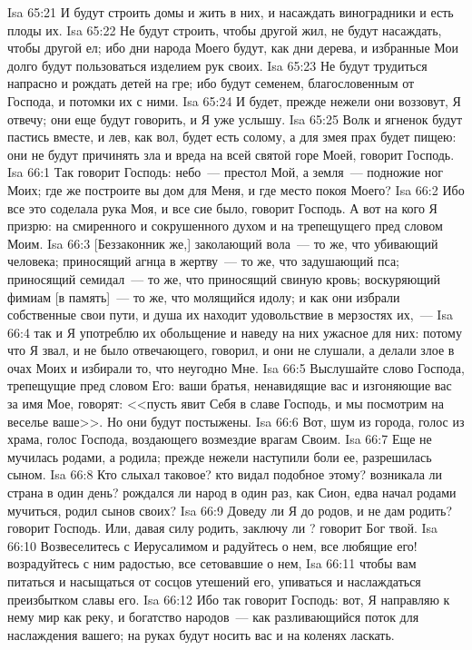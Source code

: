 \vs Isa 65:21 И будут строить домы и жить в них, и насаждать виноградники и есть плоды их.
\vs Isa 65:22 Не будут строить, чтобы другой жил, не будут насаждать, чтобы другой ел; ибо дни народа Моего будут, как дни дерева, и избранные Мои долго будут пользоваться изделием рук своих.
\vs Isa 65:23 Не будут трудиться напрасно и рождать детей на гре; ибо будут семенем, благословенным от Господа, и потомки их с ними.
\vs Isa 65:24 И будет, прежде нежели они воззовут, Я отвечу; они еще будут говорить, и Я уже услышу.
\vs Isa 65:25 Волк и ягненок будут пастись вместе, и лев, как вол, будет есть солому, а для змея прах будет пищею: они не будут причинять зла и вреда на всей святой горе Моей, говорит Господь.
\vs Isa 66:1 Так говорит Господь: небо~--- престол Мой, а земля~--- подножие ног Моих; где же построите вы дом для Меня, и где место покоя Моего?
\vs Isa 66:2 Ибо все это соделала рука Моя, и все сие было, говорит Господь. А вот на кого Я призрю: на смиренного и сокрушенного духом и на трепещущего пред словом Моим.
\vs Isa 66:3 [Беззаконник же,] заколающий вола~--- то же, что убивающий человека; приносящий агнца в жертву~--- то же, что задушающий пса; приносящий семидал~--- то же, что приносящий свиную кровь; воскуряющий фимиам [в память]~--- то же, что молящийся идолу; и как они избрали собственные свои пути, и душа их находит удовольствие в мерзостях их,~---
\vs Isa 66:4 так и Я употреблю их обольщение и наведу на них ужасное для них: потому что Я звал, и не было отвечающего, говорил, и они не слушали, а делали злое в очах Моих и избирали то, что неугодно Мне.
\rsbpar\vs Isa 66:5 Выслушайте слово Господа, трепещущие пред словом Его: ваши братья, ненавидящие вас и изгоняющие вас за имя Мое, говорят: <<пусть явит Себя в славе Господь, и мы посмотрим на веселье ваше>>. Но они будут постыжены.
\vs Isa 66:6 Вот, шум из города, голос из храма, голос Господа, воздающего возмездие врагам Своим.
\vs Isa 66:7 Еще не мучилась родами, а родила; прежде нежели наступили боли ее, разрешилась сыном.
\vs Isa 66:8 Кто слыхал таковое? кто видал подобное этому? возникала ли страна в один день? рождался ли народ в один раз, как Сион, едва начал родами мучиться, родил сынов своих?
\vs Isa 66:9 Доведу ли Я до родов, и не дам родить? говорит Господь. Или, давая силу родить, заключу ли ? говорит Бог твой.
\vs Isa 66:10 Возвеселитесь с Иерусалимом и радуйтесь о нем, все любящие его! возрадуйтесь с ним радостью, все сетовавшие о нем,
\vs Isa 66:11 чтобы вам питаться и насыщаться от сосцов утешений его, упиваться и наслаждаться преизбытком славы его.
\vs Isa 66:12 Ибо так говорит Господь: вот, Я направляю к нему мир как реку, и богатство народов~--- как разливающийся поток для наслаждения вашего; на руках будут носить вас и на коленях ласкать.
